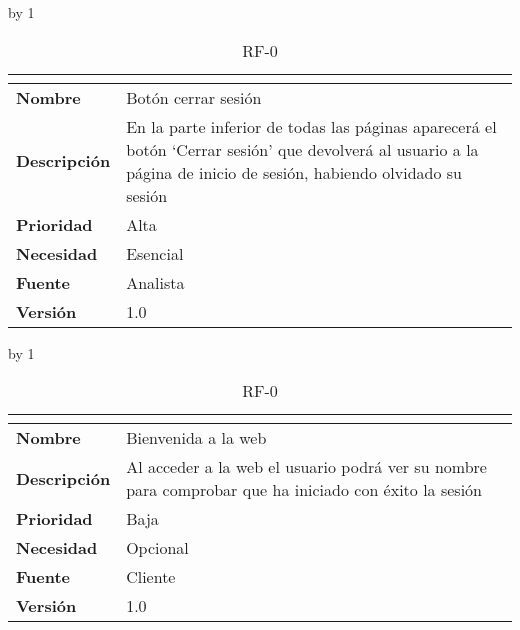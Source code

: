 \advance\rf by 1
\begin{table}[H]
	\caption{RF-0\number\rf}
	\begin{tabular}{|l|p{}|}
		\hline
		\multicolumn{2}{|c|}{\cellcolor[HTML]{BFBFBF}{\color[HTML]{000000} \textbf{RF-0\number\rf}}} \\ \hline
		\textbf{Nombre}      & Botón cerrar sesión                                                                                                                                                \\ \hline
		\textbf{Descripción} & En la parte inferior de todas las páginas aparecerá el botón ‘Cerrar sesión’ que devolverá al usuario a la página de inicio de sesión, habiendo olvidado su sesión \\ \hline
		\textbf{Prioridad}   & Alta                                                                                                                                                               \\ \hline
		\textbf{Necesidad}   & Esencial                                                                                                                                                           \\ \hline
		\textbf{Fuente}      & Analista                                                                                                                                                           \\ \hline
		\textbf{Versión}     & 1.0                                                                                                                                                                \\ \hline
	\end{tabular}
\end{table}
\advance\rf by 1
\begin{table}[H]
	\caption{RF-0\number\rf}
	\begin{tabular}{|l|p{}|}
		\hline
		\multicolumn{2}{|c|}{\cellcolor[HTML]{BFBFBF}{\color[HTML]{000000} \textbf{RF-0\number\rf}}} \\ \hline
		\textbf{Nombre}      & Bienvenida a la web                                                                                   \\ \hline
		\textbf{Descripción} & Al acceder a la web el usuario podrá ver su nombre para comprobar que ha iniciado con éxito la sesión \\ \hline
		\textbf{Prioridad}   & Baja                                                                                                  \\ \hline
		\textbf{Necesidad}   & Opcional                                                                                              \\ \hline
		\textbf{Fuente}      & Cliente                                                                                               \\ \hline
		\textbf{Versión}     & 1.0                                                                                                   \\ \hline
	\end{tabular}
\end{table}
